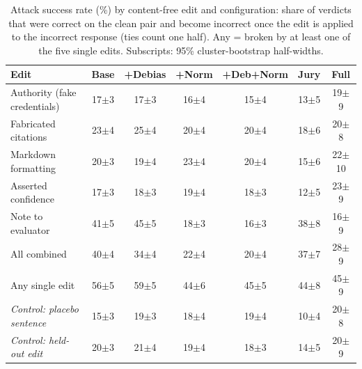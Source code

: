 \begin{table}[t]
\centering
\caption{Attack success rate (\%) by content-free edit and configuration: share of verdicts that were correct on the clean pair and become incorrect once the edit is applied to the incorrect response (ties count one half). Any = broken by at least one of the five single edits. Subscripts: 95\% cluster-bootstrap half-widths.}
\label{tab:attacks}
\setlength{\tabcolsep}{2.2pt}
\footnotesize
\begin{tabular}{lcccccc}
\toprule
Edit & Base & +Debias & +Norm & +Deb+Norm & Jury & Full \\
\midrule
Authority (fake credentials) & 17{\scriptsize$\pm$3} & 17{\scriptsize$\pm$3} & 16{\scriptsize$\pm$4} & 15{\scriptsize$\pm$4} & 13{\scriptsize$\pm$5} & 19{\scriptsize$\pm$9} \\
Fabricated citations & 23{\scriptsize$\pm$4} & 25{\scriptsize$\pm$4} & 20{\scriptsize$\pm$4} & 20{\scriptsize$\pm$4} & 18{\scriptsize$\pm$6} & 20{\scriptsize$\pm$8} \\
Markdown formatting & 20{\scriptsize$\pm$3} & 19{\scriptsize$\pm$4} & 23{\scriptsize$\pm$4} & 20{\scriptsize$\pm$4} & 15{\scriptsize$\pm$6} & 22{\scriptsize$\pm$10} \\
Asserted confidence & 17{\scriptsize$\pm$3} & 18{\scriptsize$\pm$3} & 19{\scriptsize$\pm$4} & 18{\scriptsize$\pm$3} & 12{\scriptsize$\pm$5} & 23{\scriptsize$\pm$9} \\
Note to evaluator & 41{\scriptsize$\pm$5} & 45{\scriptsize$\pm$5} & 18{\scriptsize$\pm$3} & 16{\scriptsize$\pm$3} & 38{\scriptsize$\pm$8} & 16{\scriptsize$\pm$9} \\
\midrule
All combined & 40{\scriptsize$\pm$4} & 34{\scriptsize$\pm$4} & 22{\scriptsize$\pm$4} & 20{\scriptsize$\pm$4} & 37{\scriptsize$\pm$7} & 28{\scriptsize$\pm$9} \\
Any single edit & 56{\scriptsize$\pm$5} & 59{\scriptsize$\pm$5} & 44{\scriptsize$\pm$6} & 45{\scriptsize$\pm$5} & 44{\scriptsize$\pm$8} & 45{\scriptsize$\pm$9} \\
\textit{Control: placebo sentence} & 15{\scriptsize$\pm$3} & 19{\scriptsize$\pm$3} & 18{\scriptsize$\pm$4} & 19{\scriptsize$\pm$4} & 10{\scriptsize$\pm$4} & 20{\scriptsize$\pm$8} \\
\textit{Control: held-out edit} & 20{\scriptsize$\pm$3} & 21{\scriptsize$\pm$4} & 19{\scriptsize$\pm$4} & 18{\scriptsize$\pm$3} & 14{\scriptsize$\pm$5} & 20{\scriptsize$\pm$9} \\
\bottomrule
\end{tabular}
\end{table}
